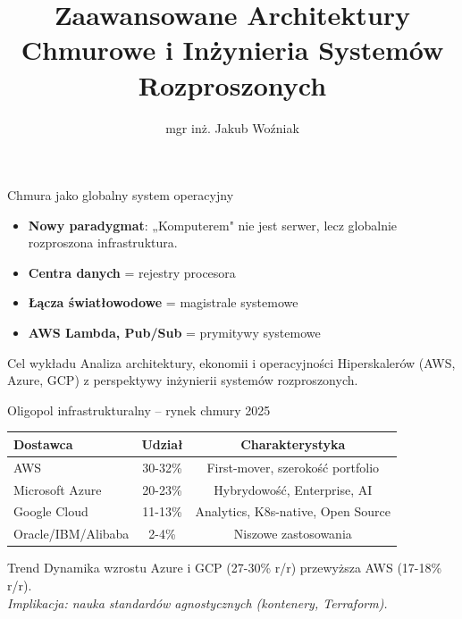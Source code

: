\documentclass[aspectratio=169]{beamer}
\author[J. Woźniak]{mgr inż. Jakub Woźniak}
\institute[PUT]{Politechnika Poznańska\\Wydział Informatyki i Telekomunikacji}
\date{}
\title[Chmura Publiczna]{Zaawansowane Architektury Chmurowe i Inżynieria Systemów Rozproszonych}
\begin{document}
\begin{frame}
    \titlepage
\end{frame}

\begin{frame}{Chmura jako globalny system operacyjny}
    \begin{itemize}
        \item \textbf{Nowy paradygmat}: „Komputerem" nie jest serwer, lecz globalnie rozproszona infrastruktura.
        \item \textbf{Centra danych} = rejestry procesora
        \item \textbf{Łącza światłowodowe} = magistrale systemowe
        \item \textbf{AWS Lambda, Pub/Sub} = prymitywy systemowe
    \end{itemize}
    \begin{block}{Cel wykładu}
        Analiza architektury, ekonomii i operacyjności Hiperskalerów (AWS, Azure, GCP) z perspektywy inżynierii systemów rozproszonych.
    \end{block}
\end{frame}

\begin{frame}{Oligopol infrastrukturalny – rynek chmury 2025}
    \begin{table}
        \footnotesize
        \begin{tabular}{lcc}
            \toprule
            \textbf{Dostawca} & \textbf{Udział} & \textbf{Charakterystyka} \\
            \midrule
            AWS & 30-32\% & First-mover, szerokość portfolio \\
            Microsoft Azure & 20-23\% & Hybrydowość, Enterprise, AI \\
            Google Cloud & 11-13\% & Analytics, K8s-native, Open Source \\
            Oracle/IBM/Alibaba & 2-4\% & Niszowe zastosowania \\
            \bottomrule
        \end{tabular}
    \end{table}
    \begin{exampleblock}{Trend}
        Dynamika wzrostu Azure i GCP (27-30\% r/r) przewyższa AWS (17-18\% r/r). \\
        \textit{Implikacja: nauka standardów agnostycznych (kontenery, Terraform).}
    \end{exampleblock}
\end{frame}
\end{document}

